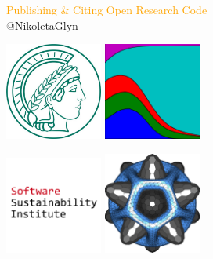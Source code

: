 \documentclass{beamer}
\begin{document}
\begin{frame}
    \begin{center}
        \Large{\textcolor{orange}{\textcolor{orange}{Publishing \& Citing Open Research Code}}} \\

        \vspace{1cm}
        \normalsize{@NikoletaGlyn}

    \end{center}
\end{frame}

\begin{frame}
    \begin{center}
    \includegraphics[width=0.24\textwidth]{static/mpi.jpg}\hspace{8pt}
    \includegraphics[width=0.24\textwidth]{static/axelrod-logo.png}\vspace{8pt}

    \includegraphics[width=0.24\textwidth]{static/ssi-logo.png}\hspace{8pt}
    \includegraphics[width=0.24\textwidth]{static/JOSS.png}
    \end{center}
\end{frame}
\end{document}
